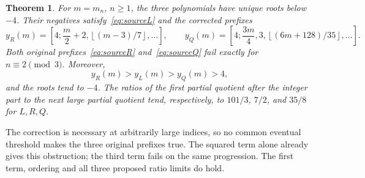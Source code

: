 \documentclass[11pt]{article}
\newtheorem{theorem}{Theorem}
\newcommand{\floor}[1]{\left\lfloor #1\right\rfloor}
\begin{document}
\begin{theorem}\label{thm:all}
For $m=m_n$, $n\ge1$, the three polynomials have unique roots below $-4$.
Their negatives satisfy~\eqref{eq:sourceL} and the corrected prefixes
\begin{equation}\label{eq:correct}
 y_R(m)=\left[4;\frac m2+2,\floor{(m-3)/7},\ldots\right],\qquad
 y_Q(m)=\left[4;\frac{3m}{4},3,\floor{(6m+128)/35},\ldots\right].
\end{equation}
Both original prefixes~\eqref{eq:sourceR} and~\eqref{eq:sourceQ} fail
exactly for $n\equiv2\pmod3$. Moreover,
\begin{equation}\label{eq:order}
 y_R(m)>y_L(m)>y_Q(m)>4,
\end{equation}
and the roots tend to $-4$. The ratios of the first partial quotient after
the integer part to the next large partial quotient tend, respectively, to
$101/3$, $7/2$, and $35/8$ for $L,R,Q$.
\end{theorem}

The correction is necessary at arbitrarily large indices, so no common
eventual threshold makes the three original prefixes true. The squared
term alone already gives this obstruction; the third term fails on the
same progression. The first term, ordering and all three proposed ratio
limits do hold.
\end{document}
